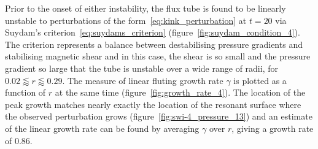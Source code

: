 \documentclass[fleqn,usenatbib]{mnras}
\begin{document}
Prior to the onset of either instability, the flux tube is found to be
linearly unstable to perturbations of the
form~\eqref{eq:kink_perturbation} at $t=20$ via Suydam's
criterion~\eqref{eq:suydams_criterion}
(figure~\ref{fig:suydam_condition_4}). The criterion represents a
balance between destabilising pressure gradients and stabilising
magnetic shear and in this case, the shear is so small and the
pressure gradient so large that the tube is unstable over a wide range
of radii, for $ 0.02 \lessapprox r \lessapprox 0.29$. The measure of
linear fluting growth rate $\gamma$ is plotted as a function of $r$ at
the same time (figure~\ref{fig:growth_rate_4}). The location of the peak growth matches nearly exactly the location of the resonant surface where the observed perturbation grows (figure~\ref{fig:swi-4_pressure_13}) and an estimate of the linear growth rate can be found by averaging $\gamma$ over $r$, giving a growth rate of $0.86$.
\end{document}
